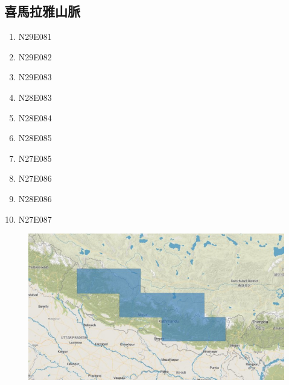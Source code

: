 \documentclass[a4paper, 12pt]{article}
\begin{document}
\begin{appendices}
\subsection{喜馬拉雅山脈}
\begin{multicols}{3}
\begin{enumerate}
    \item N29E081
    \item N29E082
    \item N29E083
    \item N28E083
    \item N28E084
    \item N28E085
    \item N27E085
    \item N27E086
    \item N28E086
    \item N27E087
\end{enumerate}
\end{multicols}
\begin{figure}[H]
    \centering
    \includegraphics[width=0.8\linewidth]{fig/a2.jpg}
\end{figure}

\end{appendices}
\end{document}
